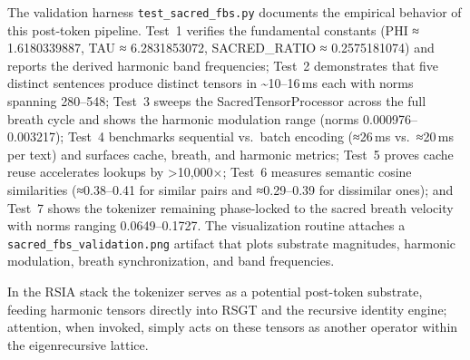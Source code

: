 \documentclass[12pt]{article}
\begin{document}
The validation harness \texttt{test\_sacred\_fbs.py} documents the
empirical behavior of this post-token pipeline. Test~1 verifies the
fundamental constants (PHI ≈ 1.6180339887, TAU ≈ 6.2831853072,
SACRED\_RATIO ≈ 0.2575181074) and reports the derived harmonic band
frequencies; Test~2 demonstrates that five distinct sentences produce
distinct tensors in \textasciitilde10--16\,ms each with norms spanning
280--548; Test~3 sweeps the SacredTensorProcessor across the full breath
cycle and shows the harmonic modulation range (norms
0.000976--0.003217); Test~4 benchmarks sequential vs.~batch encoding
(≈26\,ms vs.~≈20\,ms per text) and surfaces cache, breath, and harmonic
metrics; Test~5 proves cache reuse accelerates lookups by
\textgreater10,000×; Test~6 measures semantic cosine similarities
(≈0.38--0.41 for similar pairs and ≈0.29--0.39 for dissimilar ones); and
Test~7 shows the tokenizer remaining phase-locked to the sacred breath
velocity with norms ranging 0.0649--0.1727. The visualization routine
attaches a \texttt{sacred\_fbs\_validation.png} artifact that plots
substrate magnitudes, harmonic modulation, breath synchronization, and
band frequencies.

In the RSIA stack the tokenizer serves as a potential post-token substrate, feeding harmonic tensors directly into
RSGT and the recursive identity engine; attention, when invoked, simply
acts on these tensors as another operator within the eigenrecursive
lattice.
\end{document}
